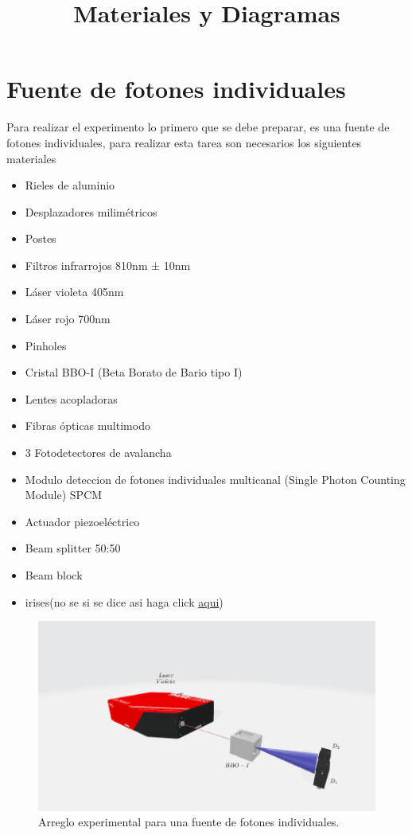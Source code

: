 \documentclass[11pt]{article}
\begin{document}
\title{Materiales y Diagramas}
\maketitle
\section{Fuente de fotones individuales}

Para realizar el experimento lo primero que se debe preparar, es una fuente de fotones individuales, para realizar esta tarea son necesarios los siguientes materiales

\begin{itemize}
\item Rieles de aluminio
\item Desplazadores milimétricos
\item Postes
\item Filtros infrarrojos 810nm ± 10nm
\item Láser violeta 405nm
\item Láser rojo 700nm
\item Pinholes
\item Cristal BBO-I (Beta Borato de Bario tipo I)
\item Lentes acopladoras
\item Fibras ópticas multimodo
\item 3 Fotodetectores de avalancha
\item Modulo deteccion de fotones individuales multicanal (Single Photon Counting
Module) SPCM
\item Actuador piezoeléctrico 
\item Beam splitter 50:50
\item Beam block
\item irises(no se si se dice asi haga click
\href{https://www.thorlabs.com/thorproduct.cfm?partnumber=ID12 }{aqui})
\end{itemize}

\begin{figure}[H]
\centering
\includegraphics[width=\linewidth]{images/es_acesso.png}
\caption{Arreglo experimental para una fuente de fotones individuales.}
\label{fig:SPDC}
\end{figure}
\end{document}
